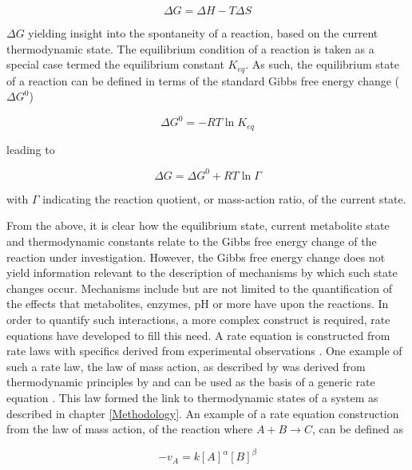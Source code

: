 \begin{equation}
\Delta G = \Delta H - T \Delta S  
\end{equation}

$\Delta G$ yielding insight into the spontaneity of a reaction, based on the current thermodynamic state. The equilibrium condition of a reaction is taken as a special case termed the equilibrium constant $K_{eq}$. As such, the equilibrium state of a reaction can be defined in terms of the standard Gibbs free energy change ($\Delta G^0$)

\begin{equation}
\Delta G^0 = -RT \ln K_{eq}  
\end{equation}

leading to 

\begin{equation}
\Delta G = \Delta G^0 + RT \ln \Gamma
\end{equation}

with $\Gamma$ indicating the reaction quotient, or mass-action ratio, of the current state.

From the above, it is clear how the equilibrium state, current metabolite state and thermodynamic constants relate to the Gibbs free energy change of the reaction under investigation. However, the Gibbs free energy change does not yield information relevant to the description of mechanisms by which such state changes occur. Mechanisms include but are not limited to the quantification of the effects that metabolites, enzymes, pH or more have upon the reactions. In order to quantify such interactions, a more complex construct is required, rate equations have developed to fill this need. A rate equation is constructed from rate laws with specifics derived from experimental observations \cite{Teusink2000, Sorribas1995}. One example of such a rate law, the law of mass action, as described by \citeauthor{Waage1986} was derived from thermodynamic principles by \citeauthor{VantHoff1884}  and can be used as the basis of a generic rate equation \cite{VantHoff1884, Waage1986, Voit2015}. This law formed the link to thermodynamic states of a system as described in chapter \ref{Methodology}. An example of a rate equation construction from the law of mass action, of the reaction where $A + B \longrightarrow C$, can be defined as

\begin{equation}\label{rateOfChange}
-v_A = k[A]^\alpha[B]^\beta
\end{equation}

